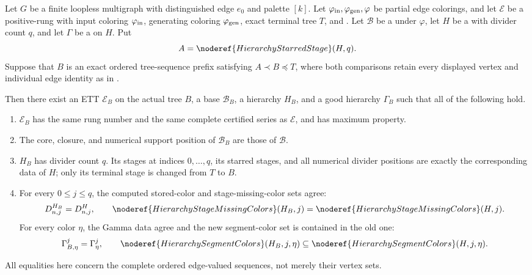 \begin{lemma}
Let $G$ be a finite loopless multigraph with distinguished edge $e_0$
and palette $[k]$.  Let $\varphi_{\rm in},\varphi_{\rm gen},\varphi$
be partial edge colorings, and let $\mathcal E$ be a positive-rung
 with input coloring
$\varphi_{\rm in}$, generating coloring $\varphi_{\rm gen}$, exact
terminal tree $T$, and .  Let $\mathcal B$ be
a  under $\varphi$, let $H$ be a
 with divider count $q$, and let $\Gamma$
be a  on $H$.  Put
\[
                    A=\noderef{HierarchyStarredStage}(H,q).
\]
Suppose that $B$ is an exact ordered tree-sequence prefix satisfying
$A\prec B\preccurlyeq T$, where both comparisons retain every displayed
vertex and individual edge identity as in
.

Then there exist an ETT $\mathcal E_B$ on the actual tree $B$, a base
$\mathcal B_B$, a hierarchy $H_B$, and a good hierarchy $\Gamma_B$
such that all of the following hold.
\begin{enumerate}
\item $\mathcal E_B$ has the same rung number and the same complete
certified series as $\mathcal E$, and has maximum property.
\item The core, closure, and numerical support position of
$\mathcal B_B$ are those of $\mathcal B$.
\item $H_B$ has divider count $q$.  Its stages at indices
$0,\ldots,q$, its starred stages, and all numerical divider positions
are exactly the corresponding data of $H$; only its terminal stage is
changed from $T$ to $B$.
\item For every $0\leq j\leq q$, the computed stored-color and
stage-missing-color sets agree:
\[
 D^{H_B}_{n,j}=D^H_{n,j},\qquad
 \noderef{HierarchyStageMissingColors}(H_B,j)
  =\noderef{HierarchyStageMissingColors}(H,j).
\]
For every color $\eta$, the Gamma data agree and the new segment-color
set is contained in the old one:
\[
 \Gamma^j_{B,\eta}=\Gamma^j_\eta,\qquad
 \noderef{HierarchySegmentColors}(H_B,j,\eta)
 \subseteq \noderef{HierarchySegmentColors}(H,j,\eta).
\]
\end{enumerate}
All equalities here concern the complete ordered edge-valued sequences,
not merely their vertex sets.
\end{lemma}
